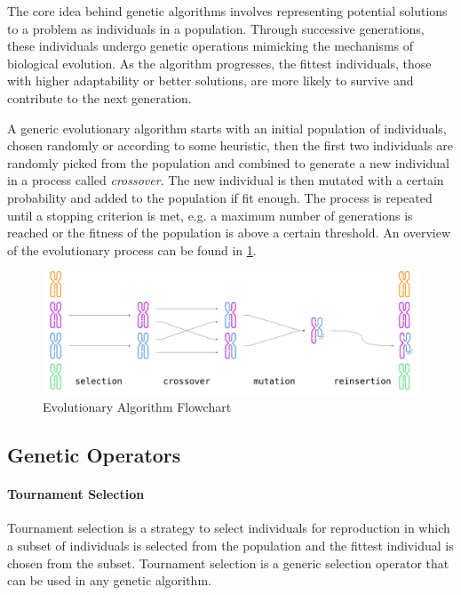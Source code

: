 The core idea behind genetic algorithms involves representing potential solutions to a problem as individuals in a population. Through successive generations, these individuals undergo genetic operations mimicking the mechanisms of biological evolution. As the algorithm progresses, the fittest individuals, those with higher adaptability or better solutions, are more likely to survive and contribute to the next generation.

A generic evolutionary algorithm starts with an initial population of individuals, chosen randomly or according to some heuristic, then the first two individuals are randomly picked from the population and combined to generate a new individual in a process called \textit{crossover}. The new individual is then mutated with a certain probability and added to the population if fit enough. The process is repeated until a stopping criterion is met, e.g. a maximum number of generations is reached or the fitness of the population is above a certain threshold. An overview of the evolutionary process can be found in \cref{fig:genetic_algo}.

\begin{figure}
    \centering
    \caption{Evolutionary Algorithm Flowchart}
    \label{fig:genetic_algo}
    \includegraphics[width=.9\textwidth]{Images/genetic_algo.png}
\end{figure}

\subsection{Genetic Operators}

\paragraph{Tournament Selection}

Tournament selection is a strategy to select individuals for reproduction in which a subset of individuals is selected from the population and the fittest individual is chosen from the subset. Tournament selection is a generic selection operator that can be used in any genetic algorithm.

